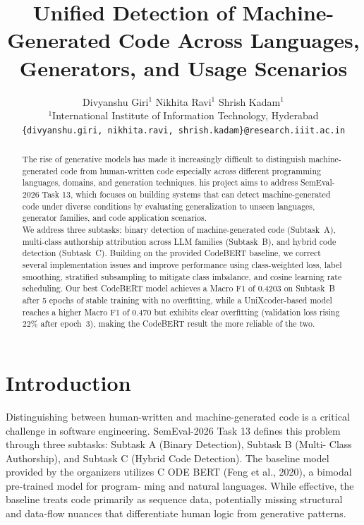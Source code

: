 \documentclass[11pt]{article}
\title{Unified Detection of Machine-Generated
Code Across Languages, Generators, and
Usage Scenarios}
\author{
  Divyanshu Giri$^1$ \quad Nikhita Ravi$^1$ \quad Shrish Kadam$^1$ \\
  $^1$International Institute of Information Technology, Hyderabad \\
  \texttt{\{divyanshu.giri, nikhita.ravi, shrish.kadam\}@research.iiit.ac.in}
}
\begin{document}
\maketitle
\begin{abstract}

The rise of generative models has made it increasingly difﬁcult to distinguish machine-generated code from human-written code especially across different programming languages, domains, and generation techniques. his project aims to address SemEval-2026 Task 13, which focuses on building systems that can detect machine-generated code under diverse conditions by evaluating generalization to unseen languages, generator families, and code application scenarios.\\
We address three subtasks: binary detection of machine-generated code (Subtask~A), multi-class authorship attribution across LLM families (Subtask~B), and hybrid code detection (Subtask~C). Building on the provided CodeBERT baseline, we correct several implementation issues and improve performance using class-weighted loss, label smoothing, stratified subsampling to mitigate class imbalance, and cosine learning rate scheduling. Our best CodeBERT model achieves a Macro F1 of 0.4203 on Subtask~B after 5 epochs of stable training with no overfitting, while a UniXcoder-based model reaches a higher Macro F1 of 0.470 but exhibits clear overfitting (validation loss rising 22\% after epoch~3), making the CodeBERT result the more reliable of the two.
\end{abstract}

\section{Introduction}
\label{sec:intro}

Distinguishing between human-written and
machine-generated code is a critical challenge
in software engineering. SemEval-2026 Task
13 deﬁnes this problem through three subtasks:
Subtask A (Binary Detection), Subtask B (Multi-
Class Authorship), and Subtask C (Hybrid Code
Detection). The baseline model provided by
the organizers utilizes C ODE BERT (Feng et al.,
2020), a bimodal pre-trained model for program-
ming and natural languages. While effective,
the baseline treats code primarily as sequence
data, potentially missing structural and data-ﬂow
nuances that differentiate human logic from
generative patterns.
\end{document}
